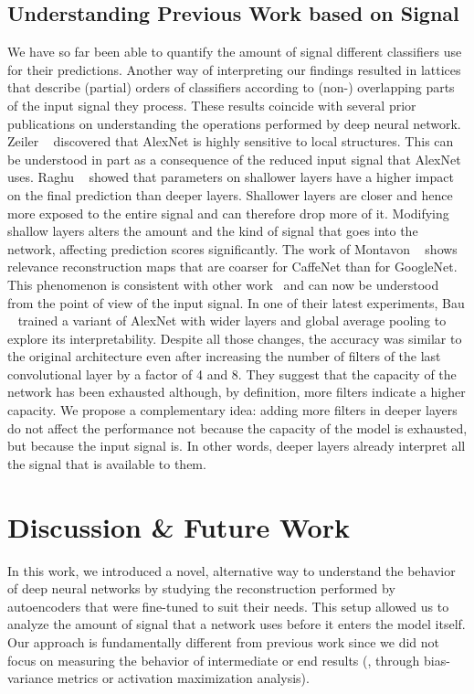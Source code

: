 \documentclass[10pt,twocolumn,a4paper]{article}
\begin{document}
\subsection{Understanding Previous Work based on Signal}
We have so far been able to quantify the amount of signal different classifiers use for their predictions.
Another way of interpreting our findings resulted in lattices that describe (partial) orders of classifiers according to (non-) overlapping parts of the input signal they process.
These results coincide with several prior publications on understanding the operations performed by deep neural network.
Zeiler \etal~\cite{zeiler2014visualizing} discovered that AlexNet is highly sensitive to local structures.
This can be understood in part as a consequence of the reduced input signal that AlexNet uses.
Raghu \etal~\cite{raghu2016expressive} showed that parameters on shallower layers have a higher impact on the final prediction than deeper layers.
Shallower layers are closer and hence more exposed to the entire signal and can therefore drop more of it.
Modifying shallow layers alters the amount and the kind of signal that goes into the network, affecting prediction scores significantly.
The work of Montavon \etal~\cite{montavon2017explaining} shows relevance reconstruction maps that are coarser for CaffeNet than for GoogleNet.
This phenomenon is consistent with other work~\cite{lapuschkin2016analysing} and can now be understood from the point of view of the input signal.
In one of their latest experiments, Bau \etal~\cite{netdissect2017} trained a variant of AlexNet with wider layers and global average pooling to explore its interpretability.
Despite all those changes, the accuracy was similar to the original architecture even after increasing the number of filters of the last convolutional layer by a factor of 4 and 8.
They suggest that the capacity of the network has been exhausted although, by definition, more filters indicate a higher capacity.
We propose a complementary idea: adding more filters in deeper layers do not affect the performance not because the capacity of the model is exhausted, but because the input signal is.
In other words, deeper layers already interpret all the signal that is available to them.



\section{Discussion \& Future Work}

In this work, we introduced a novel, alternative way to understand the behavior of deep neural networks by studying the reconstruction performed by autoencoders that were fine-tuned to suit their needs.
This setup allowed us to analyze the amount of signal that a network uses before it enters the model itself.
Our approach is fundamentally different from previous work since we did not focus on measuring the behavior of intermediate or end results (\eg, through bias-variance metrics or activation maximization analysis).
\end{document}

